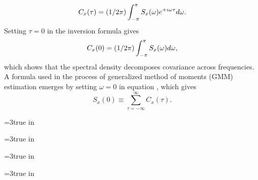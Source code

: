 $$C_x(\tau) =(1/2\pi)\int_{-\pi}^\pi S_x({\omega}) e^{+i{\omega}\tau} d{\omega}.$$
%
%
%
 Setting $\tau=0$ in the inversion formula gives
$$C_x(0) =(1/2\pi)\int_{-\pi}^\pi S_x({\omega})  d{\omega},$$
which shows that the spectral
density  decomposes covariance across
 frequencies.
A formula used  in the process
of generalized method of moments (GMM) estimation
emerges by  setting $\omega=0$ in equation , which gives
$$S_x(0) \equiv \sum_{\tau=-\infty}^{\infty}
C_x (\tau) .  $$  \centerline{\epsfxsize=3true
in} \caption{Impulse response, spectrum,
covariogram, and sample path of process $(1 - 1.3L + .7L^2) y_t =
w_t $.} 
\endfigure

\vfill\eject






  \centerline{\epsfxsize=3true
in} \caption{Impulse response, spectrum,
covariogram, and sample path of process $(1 - .9L) y_t = w_t $.}
\endfigure


\centerline{\epsfxsize=3true in}
\caption{Impulse response, spectrum, covariogram, and
sample path
 of process $(1 - .8L^4) y_t = w_t $.}
\endfigure


 \centerline{\epsfxsize=3true
in} \caption{Impulse response, spectrum,
covariogram, and sample path of process $(1 - .98L) y_t =(1 - .7L)
w_t $.} 
\endfigure

